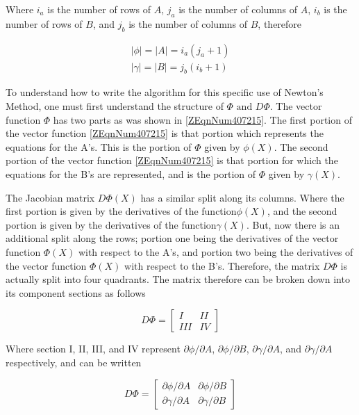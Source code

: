 \documentclass{article}
\newcommand{\pard}[2]{\partial #1 / \partial #2}
\newcommand{\spbox}[1]{ \text{ #1 }} %
\begin{document}
Where $i_{a} $ is the number of rows of $A$, $j_{a} $ is the number of columns
of $A$, $i_{b} $ is the number of rows of $B$, and $j_{b} $ is the number of
columns of $B$, therefore

\begin{equation} \label{ZEqnNum134946} \begin{array}{l} {\left|\phi
\right|=\left|A\right|=i_{a} \left(j_{a} +1\right)} \\ {\left|\gamma
\right|=\left|B\right|=j_{b} \left(i_{b} +1\right)} \end{array} \end{equation}

To understand how to write the algorithm for this specific use of Newton's
Method, one must first understand the structure of $\Phi \spbox{and} D\Phi $. The
vector function $\Phi $ has two parts as was shown in \eqref{ZEqnNum407215}. The
first portion of the vector function \eqref{ZEqnNum407215} is that portion which
represents the equations for the A's. This is the portion of $\Phi $ given by
$\phi (X)$. The second portion of the vector function \eqref{ZEqnNum407215} is
that portion for which the equations for the B's are represented, and is the
portion of $\Phi $ given by $\gamma (X)$.

The Jacobian matrix $D\Phi \left(X\right)$ has a similar split along its
columns. Where the first portion is given by the derivatives of the
function$\phi \left(X\right)$, and the second portion is given by the
derivatives of the function$\gamma \left(X\right)$. But, now there is an
additional split along the rows; portion one being the derivatives of the
vector function $\Phi \left(X\right)$ with respect to the A's, and portion two
being the derivatives of the vector function $\Phi \left(X\right)$ with respect
to the B's. Therefore, the matrix $D\Phi $ is actually split into four
quadrants. The matrix therefore can be broken down into its component sections
as follows

\begin{equation*}
    D \Phi = \begin{bmatrix} 
    I & II \\ 
    III & IV \end{bmatrix}
\end{equation*} 

Where section I, II, III, and IV represent $\pard{\phi}{A}$, $\pard{\phi}{B}$,
$\pard{\gamma}{A}$, and $\pard{\gamma}{A}$ respectively, and can be written

\begin{equation} \label{4.8)} 
    D \Phi = \begin{bmatrix}
    \pard{\phi}{A} & \pard{\phi}{B} \\ 
    \pard{\gamma}{A} & \pard{\gamma}{B} \end{bmatrix}
\end{equation}
\end{document}
